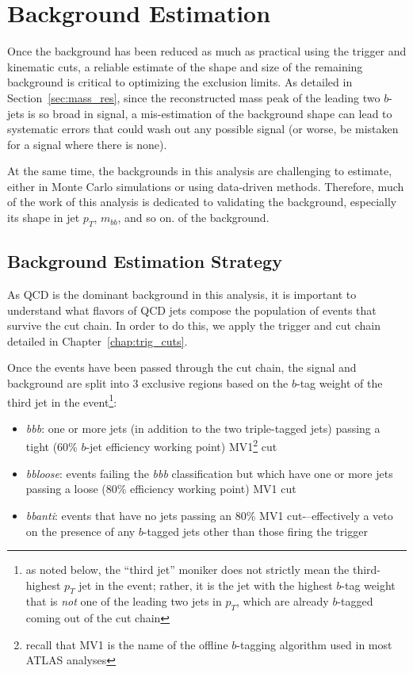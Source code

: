  

\chapter[Background Estimation]{Background Estimation}

Once the background has been reduced as much as practical using the trigger and kinematic cuts,
a reliable estimate of the shape and size of the remaining background is critical to optimizing
the exclusion limits.  As detailed in Section~\ref{sec:mass_res}, since the reconstructed mass peak 
of the leading two $b$-jets is so
broad in signal, a mis-estimation of the background shape can lead to systematic errors that
could wash out any possible signal (or worse, be mistaken for a signal where there is none).  

At the same time, the backgrounds in this analysis are challenging to estimate, either in Monte
Carlo simulations or using data-driven methods.  Therefore, much of the work of this analysis is dedicated
to validating the background, especially its shape in jet $p_T$, $m_{bb}$, and so on.
of the background.  

\section{Background Estimation Strategy}
\label{sec:background_strategy}
As QCD is the dominant background in this analysis, it is important to understand
what flavors of QCD jets compose the population of events that survive the cut
chain.  In order to do this, we apply the trigger and cut chain detailed in Chapter~\ref{chap:trig_cuts}.

Once the events have been passed through the cut chain, 
the signal and background are split into 3 exclusive regions based on the $b$-tag weight of the
third jet in the event\footnote{as noted below, the ``third jet'' moniker does not strictly
mean the third-highest $p_T$ jet in the event; rather, it is the jet with the highest $b$-tag weight
that is \textit{not} one of the leading two jets in $p_T$, which are already $b$-tagged coming
out of the cut chain}:
\begin{itemize}
    \item \textit{bbb}: one or more jets (in addition to the two triple-tagged jets) passing a tight (60\% $b$-jet efficiency working point)
 MV1\footnote{recall that MV1 is the name of the offline $b$-tagging algorithm used in most ATLAS analyses} cut
    \item \textit{bbloose}: events failing the \textit{bbb} classification but which have one or more jets passing a loose (80\% efficiency
 working point) MV1 cut
    \item \textit{bbanti}: events that have no jets passing an 80\% MV1 cut-–effectively a veto on the presence of any
 $b$-tagged jets other than those firing the trigger
\end{itemize}

